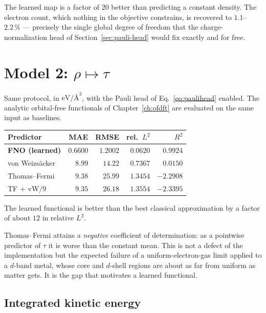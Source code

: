 The learned map is a factor of $20$ better than predicting a constant density.
The electron count, which nothing in the objective constrains, is recovered to
$1.1$--$2.2\,\%$ --- precisely the single global degree of freedom that the
charge-normalization head of Section~\ref{sec:pauli-head} would fix exactly and
for free.

\section{Model 2: \texorpdfstring{$\rho \mapsto \tau$}{rho to tau}}

Same protocol, in $\mathrm{eV}/\text{\AA}^3$, with the Pauli head of
Eq.~\eqref{eq:paulihead} enabled. The analytic orbital-free functionals of
Chapter~\ref{ch:ofdft} are evaluated on the same input as baselines.

\begin{center}
\begin{tabular}{@{}lrrrr@{}}
\toprule
Predictor & MAE & RMSE & rel.\ $L^2$ & $R^2$ \\
\midrule
\textbf{FNO (learned)} & $\mathbf{0.6600}$ & $\mathbf{1.2002}$ & $\mathbf{0.0620}$ & $\mathbf{0.9924}$ \\
\midrule
von Weizsäcker & $8.99$ & $14.22$ & $0.7367$ & $0.0150$ \\
Thomas--Fermi & $9.38$ & $25.99$ & $1.3454$ & $-2.2908$ \\
TF $+$ vW$/9$ & $9.35$ & $26.18$ & $1.3554$ & $-2.3395$ \\
\bottomrule
\end{tabular}
\end{center}

The learned functional is better than the best classical approximation by a
factor of about $12$ in relative $L^2$.

\begin{pnote}
Thomas--Fermi attains a \emph{negative} coefficient of determination: as a
pointwise predictor of $\tau$ it is worse than the constant mean. This is not a
defect of the implementation but the expected failure of a uniform-electron-gas
limit applied to a $d$-band metal, whose core and $d$-shell regions are about as
far from uniform as matter gets. It is the gap that motivates a learned
functional.
\end{pnote}

\subsection{Integrated kinetic energy}

